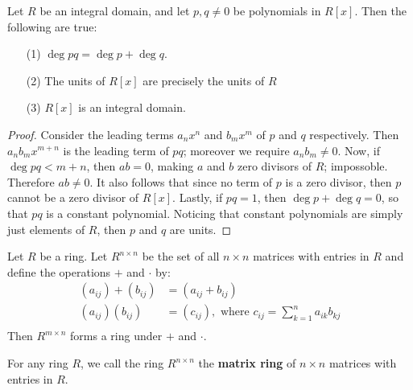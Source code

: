 \begin{theorem}\label{theorem_5.2.2}
    Let $R$ be an integral domain, and let  $p,q \neq 0$ be polynomials in
    $R[x]$. Then the following are true:
    \begin{enumerate}
        \item[(1)] $\deg{pq}=\deg{p}+\deg{q}$.

        \item[(2)] The units of $R[x]$ are precisely the units of $R$

        \item[(3)] $R[x]$ is an integral domain.
    \end{enumerate}
\end{theorem}
\begin{proof}
    Consider the leading terms $a_nx^n$ and  $b_mx^m$ of  $p$ and  $q$
    respectively. Then  $a_nb_mx^{m+n}$ is the leading term of $pq$; moreover we
    require $a_nb_m \neq 0$. Now, if $\deg{pq}<m+n$, then $ab=0$, making $a$ and
    $b$ zero divisors of  $R$; impossoble. Therefore  $ab \neq 0$. It also
    follows that since no term of $p$ is a zero divisor, then $p$ cannot be a
    zero divisor of  $R[x]$. Lastly, if $pq=1$, then $\deg{p}+\deg{q}=0$, so
    that $pq$ is a constant polynomial. Noticing that constant polynomials are
    simply just elements of $R$, then $p$ and $q$ are units.
\end{proof}

\begin{theorem}\label{theorem_5.2.3}
    Let $R$ be a ring. Let  $R^{n \times n}$ be the set of all $n \times n$
    matrices with entries in $R$ and define the operations $+$ and  $\cdot$ by:
    \begin{align*}
        (a_{ij})+(b_{ij})   &= (a_{ij}+b_{ij})  \\
        (a_{ij})(b_{ij})    &=  (c_{ij}), \text{ where }
        c_{ij}=\sum_{k=1}^n{a_{ik}b_{kj}}   \\
    \end{align*}
    Then $R^{m \times n}$ forms a ring under $+$ and $\cdot$.
\end{theorem}

\begin{definition}
    For any ring $R$, we call the ring  $R^{n \times n}$ the  \textbf{matrix
    ring} of $n \times n$ matrices with entries in $R$.
\end{definition}

